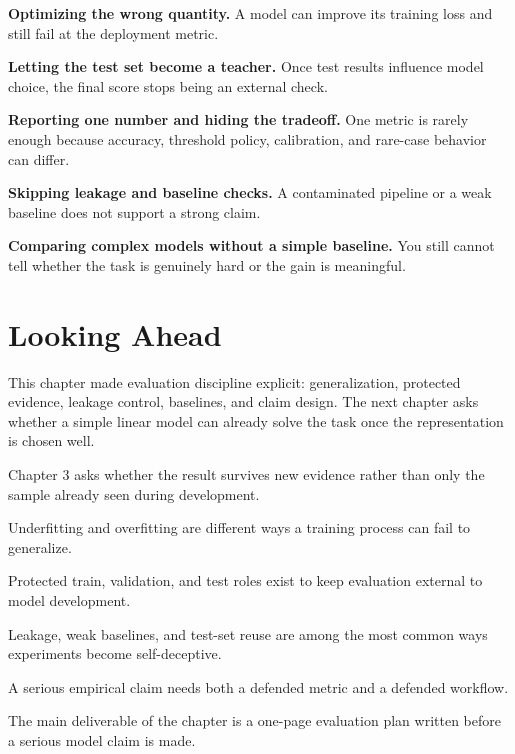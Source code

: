 \begin{mistakebox}
\item \textbf{Optimizing the wrong quantity.} A model can improve its training loss and still fail at the deployment metric.
\item \textbf{Letting the test set become a teacher.} Once test results influence model choice, the final score stops being an external check.
\item \textbf{Reporting one number and hiding the tradeoff.} One metric is rarely enough because accuracy, threshold policy, calibration, and rare-case behavior can differ.
\item \textbf{Skipping leakage and baseline checks.} A contaminated pipeline or a weak baseline does not support a strong claim.
\item \textbf{Comparing complex models without a simple baseline.} You still cannot tell whether the task is genuinely hard or the gain is meaningful.
\end{mistakebox}

\section{Looking Ahead}

This chapter made evaluation discipline explicit: generalization, protected evidence, leakage control, baselines, and claim design. The next chapter asks whether a simple linear model can already solve the task once the representation is chosen well.

\begin{chaptersummary}
\item Chapter 3 asks whether the result survives new evidence rather than only the sample already seen during development.
\item Underfitting and overfitting are different ways a training process can fail to generalize.
\item Protected train, validation, and test roles exist to keep evaluation external to model development.
\item Leakage, weak baselines, and test-set reuse are among the most common ways experiments become self-deceptive.
\item A serious empirical claim needs both a defended metric and a defended workflow.
\item The main deliverable of the chapter is a one-page evaluation plan written before a serious model claim is made.
\end{chaptersummary}

